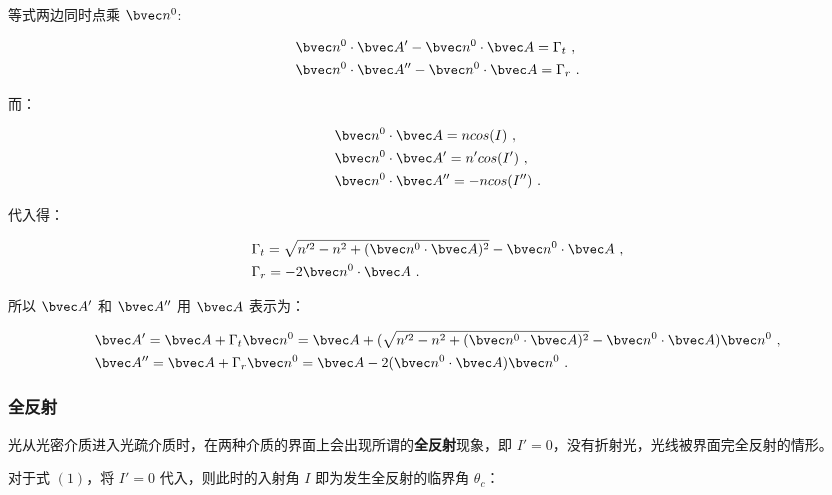 等式两边同时点乘 $\bvec n^0$:

\begin{equation}
\begin{aligned}
& \bvec n^0 \cdot \bvec A' - \bvec n^0 \cdot \bvec A = \Gamma _ t ~, \\
& \bvec n^0 \cdot \bvec A'' - \bvec n^0 \cdot \bvec A = \Gamma _ r ~.
\end{aligned}
\end{equation}

而：

\begin{equation}
\begin{aligned}
& \bvec n^0 \cdot \bvec A = ncos(I) ~, \\
& \bvec n^0 \cdot \bvec A' = n'cos(I') ~, \\
& \bvec n^0 \cdot \bvec A'' = -ncos(I'') ~.
\end{aligned}
\end{equation}

代入得：

\begin{equation}
\begin{aligned}
& \Gamma _ t = \sqrt{n'^2 - n^2 + (\bvec n^0 \cdot \bvec A)^2} - \bvec n^0 \cdot \bvec A ~, \\
& \Gamma _ r = -2 \bvec n^0 \cdot \bvec A ~.
\end{aligned}
\end{equation}

所以 $\bvec A'$ 和 $\bvec A''$ 用 $\bvec A$ 表示为：

\begin{equation}
\begin{aligned}
& \bvec A' = \bvec A + \Gamma _ t \bvec n^0 = \bvec A + (\sqrt{n'^2 - n^2 + (\bvec n^0 \cdot \bvec A)^2} - \bvec n^0 \cdot \bvec A)\bvec n^0 ~, \\
& \bvec A'' = \bvec A + \Gamma _ r \bvec n^0 = \bvec A - 2(\bvec n^0 \cdot \bvec A) \bvec n^0 ~.
\end{aligned}
\end{equation}

\subsubsection{全反射}

光从光密介质进入光疏介质时，在两种介质的界面上会出现所谓的\textbf{全反射}现象，即 $I'=0$，没有折射光，光线被界面完全反射的情形。

对于式 $(1)$，将 $I'=0$ 代入，则此时的入射角 $I$ 即为发生全反射的临界角 $\theta_c$：

